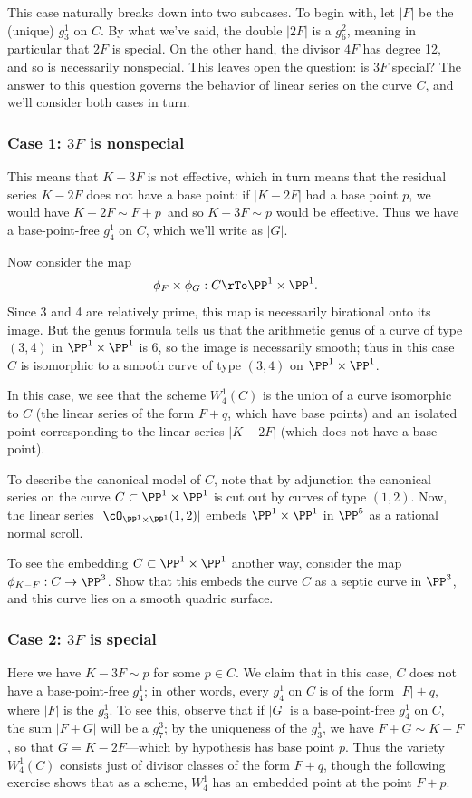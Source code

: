 This case naturally breaks down into two subcases. To begin with, let $|F|$ be the (unique) $g^1_3$ on $C$. By what we've said, the double $|2F|$ is a $g^2_6$, meaning in particular that $2F$ is special. On the other hand, the divisor $4F$ has degree 12, and so is necessarily nonspecial. This leaves open the question: is $3F$ special? The answer to this question governs the behavior of linear series on the curve $C$, and we'll consider both cases in turn.

\subsubsection{Case 1: $3F$ is nonspecial} This means that $K-3F$ is not effective, which in turn means that the residual series $K-2F$ does not have a base point: if $|K-2F|$ had a base point $p$, we would have $K - 2F \sim F + p$\, and so $K-3F \sim p$ would be effective. Thus we have a base-point-free $g^1_4$ on $C$, which we'll write as $|G|$.

Now consider the map
$$
\phi_F \times \phi_G : C \rTo \PP^1 \times \PP^1.
$$
Since 3 and 4 are relatively prime, this map is necessarily birational onto its image. But the genus formula tells us that the arithmetic genus of a curve of type $(3,4)$ in $\PP^1 \times \PP^1$ is 6, so the image is necessarily smooth; thus in this case $C$ is isomorphic to a smooth curve of type $(3,4)$ on $\PP^1 \times \PP^1$.

In this case, we see that the scheme $W^1_4(C)$ is the union of a curve isomorphic to $C$ (the linear series of the form $F + q$, which have base points) and an isolated point corresponding to the linear series $|K - 2F|$ (which does not have a base point).

To describe the canonical model of $C$, note that by adjunction the canonical series on the curve $C \subset \PP^1 \times \PP^1$ is cut out by curves of type $(1,2)$. Now, the linear series $|\cO_{\PP^1 \times \PP^1}(1,2)|$ embeds $\PP^1 \times \PP^1$ in $\PP^5$ as a rational normal scroll.

\begin{exercise}
To see the embedding $C \subset \PP^1 \times \PP^1$ another way, consider the map $\phi_{K-F} : C \to \PP^3$. Show that this embeds the curve $C$ as a septic curve in $\PP^3$, and this curve lies on a smooth quadric surface.
\end{exercise}

\subsubsection{Case 2: $3F$ is special}  Here we have $K - 3F \sim p$ for some $p \in C$. We claim that in this case, $C$ does not have a base-point-free $g^1_4$; in other words, every $g^1_4$ on $C$ is of the form $|F| + q$, where $|F|$ is the $g^1_3$. To see this, observe that if $|G|$ is a base-point-free $g^1_4$ on $C$, the sum $|F+G|$ will be a $g^3_7$; by the uniqueness of the $g^1_3$, we have $F+G \sim K - F$, so that $G = K-2F$---which by hypothesis has base point $p$. Thus the variety $W^1_4(C)$ consists just of divisor classes of the form $F+q$, though the following exercise shows that as a scheme, $W^1_4$ has an embedded point at the point $F+p$.

